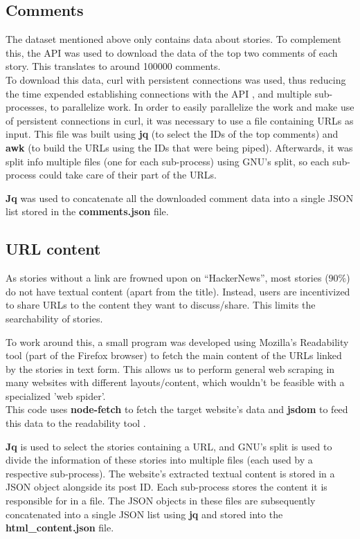 \documentclass[sigconf]{acmart}
\begin{document}
\subsection{Comments}
The dataset mentioned above only contains data about stories. To
complement this, the API \cite{API} was used to download the data of the
top two comments of each story. This translates to around
100000 comments.\\
To download this data, curl with persistent connections was used,
thus reducing the time expended establishing connections with
the API \cite{API}, and multiple sub-processes, to parallelize work. In
order to easily parallelize the work and make use of persistent
connections in curl, it was necessary to use a file containing URLs
as input. This file was built using \textbf{jq} \cite{jq} (to select the
IDs of the top comments) and \textbf{awk} (to build the URLs using
the IDs that were being piped). Afterwards, it was split info
multiple files (one for each sub-process) using GNU's split,
so each sub-process could take care of their part of the URLs.

\textbf{Jq} \cite{jq} was used to concatenate all the downloaded comment
data into a single JSON list stored in the \textbf{comments.json}
file.

\subsection{URL content}
As stories without a link are frowned upon on ``HackerNews'', most
stories ($90\%$) do not have textual content (apart from the title).
Instead, users are incentivized to share URLs to the content they
want to discuss/share. This limits the searchability of stories.

To work around this, a small program was developed using
Mozilla's Readability tool \cite{readability} (part of the Firefox
browser) to fetch the main content of the URLs linked by the stories
in text form. This allows us to perform general web scraping
in many websites with different layouts/content, which wouldn't
be feasible with a specialized 'web spider'.\\
This code uses \textbf{node-fetch} \cite{node-fetch} to fetch the
target website's data and \textbf{jsdom} \cite{jsdom} to feed this
data to the readability tool \cite{readability}.

\textbf{Jq} \cite{jq} is used to select the stories containing
a URL, and GNU's split is used to divide the information of these
stories into multiple files (each used by a respective sub-process).
The website's extracted textual content is stored in a JSON
object alongside its post ID. Each sub-process stores the
content it is responsible for in a file. The JSON objects in
these files are subsequently concatenated into a single JSON
list using \textbf{jq} \cite{jq} and stored into the
\textbf{html\_content.json} file.
\end{document}

